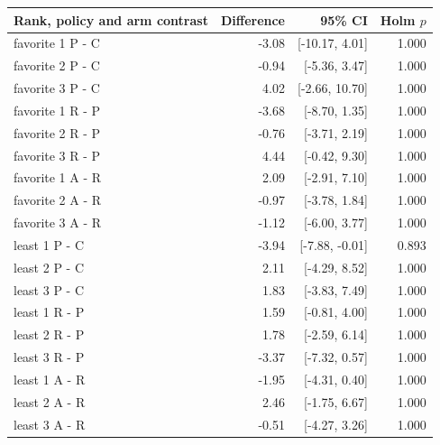 \begin{tabular}{@{}p{5.9cm}rrr@{}}
\toprule
Rank, policy and arm contrast & Difference & 95\% CI & Holm $p$ \\
\midrule
favorite 1 P - C & -3.08 & [-10.17, 4.01] & 1.000 \\
favorite 2 P - C & -0.94 & [-5.36, 3.47] & 1.000 \\
favorite 3 P - C & 4.02 & [-2.66, 10.70] & 1.000 \\
favorite 1 R - P & -3.68 & [-8.70, 1.35] & 1.000 \\
favorite 2 R - P & -0.76 & [-3.71, 2.19] & 1.000 \\
favorite 3 R - P & 4.44 & [-0.42, 9.30] & 1.000 \\
favorite 1 A - R & 2.09 & [-2.91, 7.10] & 1.000 \\
favorite 2 A - R & -0.97 & [-3.78, 1.84] & 1.000 \\
favorite 3 A - R & -1.12 & [-6.00, 3.77] & 1.000 \\
least 1 P - C & -3.94 & [-7.88, -0.01] & 0.893 \\
least 2 P - C & 2.11 & [-4.29, 8.52] & 1.000 \\
least 3 P - C & 1.83 & [-3.83, 7.49] & 1.000 \\
least 1 R - P & 1.59 & [-0.81, 4.00] & 1.000 \\
least 2 R - P & 1.78 & [-2.59, 6.14] & 1.000 \\
least 3 R - P & -3.37 & [-7.32, 0.57] & 1.000 \\
least 1 A - R & -1.95 & [-4.31, 0.40] & 1.000 \\
least 2 A - R & 2.46 & [-1.75, 6.67] & 1.000 \\
least 3 A - R & -0.51 & [-4.27, 3.26] & 1.000 \\
\bottomrule
\end{tabular}
